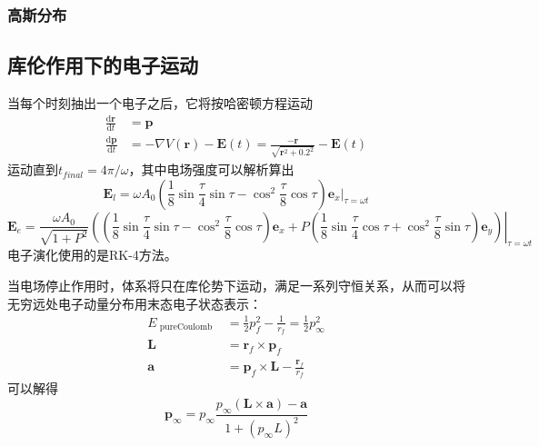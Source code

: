 \documentclass[a4paper]{ctexart}
\begin{document}
\subsubsection{高斯分布}
\subsection{库伦作用下的电子运动}
当每个时刻抽出一个电子之后，它将按哈密顿方程运动
\begin{equation}
\begin{aligned} \frac{\mathrm{d} \mathbf{r}}{\mathrm{d} t} &=\mathbf{p} \\ \frac{\mathrm{d} \mathbf{p}}{\mathrm{d} t} &=-\nabla V(\mathbf{r})-\mathbf{E}(t)=\frac{-\mathbf{r}}{\sqrt{\mathbf{r}^{2}+0.2^{2}}}-\mathbf{E}(t) \end{aligned}
\end{equation}
运动直到$t_{final}=4\pi/\omega$，其中电场强度可以解析算出
\begin{equation}
\mathbf{E}_{l}=\omega A_{0}\left(\frac{1}{8} \sin \frac{\tau}{4} \sin \tau-\cos ^{2} \frac{\tau}{8} \cos \tau\right)\left.\mathbf{e}_{x}\right|_{\tau=\omega t}
\end{equation}
\begin{equation}
\mathbf{E}_{e}=\frac{\omega A_{0}}{\sqrt{1+P^{2}}}\left.\left(\left(\frac{1}{8} \sin \frac{\tau}{4} \sin \tau-\cos ^{2} \frac{\tau}{8} \cos \tau\right) \mathbf{e}_{x}+P\left(\frac{1}{8} \sin \frac{\tau}{4} \cos \tau+\cos ^{2} \frac{\tau}{8} \sin \tau\right) \mathbf{e}_{y}\right)\right|_{\tau=\omega t}
\end{equation}
电子演化使用的是RK-4方法。

当电场停止作用时，体系将只在库伦势下运动，满足一系列守恒关系，从而可以将无穷远处电子动量分布用末态电子状态表示：
\begin{equation}
\begin{aligned} E_{\text { pureCoulomb }} &=\frac{1}{2} p_{f}^{2}-\frac{1}{r_{f}}=\frac{1}{2} p_{\infty}^{2} \\ \mathbf{L} &=\mathbf{r}_{f} \times \mathbf{p}_{f} \\ \mathbf{a} &=\mathbf{p}_{f} \times \mathbf{L}-\frac{\mathbf{r}_{f}}{r_{f}} \end{aligned}
\end{equation}
可以解得
\begin{equation}
\mathbf{p}_{\infty}=p_{\infty} \frac{p_{\infty}(\mathbf{L} \times \mathbf{a})-\mathbf{a}}{1+\left(p_{\infty} L\right)^{2}}
\end{equation}
\end{document}

